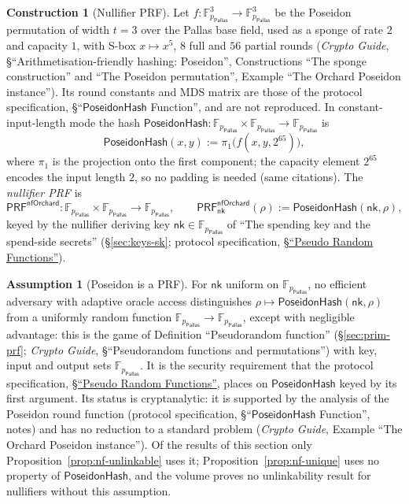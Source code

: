 \documentclass[11pt,a4paper]{article}
\theoremstyle{definition}
\newtheorem{construction}[theorem]{Construction}
\newtheorem{assumption}[theorem]{Assumption}
\newcommand{\F}{\mathbb{F}}
\newcommand{\Pallas}{\ensuremath{\mathsf{Pallas}}}
\newcommand{\nksym}{\ensuremath{\mathsf{nk}}}
\begin{document}
\begin{construction}[Nullifier PRF]
Let $f \colon \F_{p_{\Pallas}}^{3} \to \F_{p_{\Pallas}}^{3}$ be the Poseidon
permutation of width $t = 3$ over the Pallas base field, used as a sponge of
rate $2$ and capacity $1$, with S-box $x \mapsto x^{5}$, $8$ full and $56$
partial rounds (\emph{Crypto Guide}, \S``Arithmetisation-friendly hashing:
Poseidon'', Constructions ``The sponge construction'' and ``The Poseidon
permutation'', Example ``The Orchard Poseidon instance''). Its round
constants and MDS matrix are those of the protocol specification,
\S``$\mathsf{PoseidonHash}$ Function'', and are not reproduced. In
constant-input-length mode the hash
$\mathsf{PoseidonHash} \colon \F_{p_{\Pallas}} \times \F_{p_{\Pallas}} \to
\F_{p_{\Pallas}}$ is
\[
  \mathsf{PoseidonHash}(x, y) := \pi_1\bigl(f(x, y, 2^{65})\bigr),
\]
where $\pi_1$ is the projection onto the first component; the capacity
element $2^{65}$ encodes the input length $2$, so no padding is needed (same
citations). The \emph{nullifier PRF} is
\[
  \mathsf{PRF}^{\mathsf{nfOrchard}} \colon \F_{p_{\Pallas}} \times
    \F_{p_{\Pallas}} \to \F_{p_{\Pallas}}, \qquad
  \mathsf{PRF}^{\mathsf{nfOrchard}}_{\nksym}(\rho) :=
    \mathsf{PoseidonHash}(\nksym, \rho),
\]
keyed by the nullifier deriving key $\nksym \in \F_{p_{\Pallas}}$ of ``The
spending key and the spend-side secrets'' (\S\ref{sec:keys-sk}; protocol
specification,
\href{https://zips.z.cash/protocol/protocol.pdf#concreteprfs}%
{\S``Pseudo Random Functions''}).
\end{construction}

\begin{assumption}[Poseidon is a PRF]\label{ass:poseidon-prf}
For $\nksym$ uniform on $\F_{p_{\Pallas}}$, no efficient adversary with
adaptive oracle access distinguishes
$\rho \mapsto \mathsf{PoseidonHash}(\nksym, \rho)$ from a uniformly random
function $\F_{p_{\Pallas}} \to \F_{p_{\Pallas}}$, except with negligible
advantage: this is the game of Definition ``Pseudorandom function''
(\S\ref{sec:prim-prf}; \emph{Crypto Guide}, \S``Pseudorandom functions and
permutations'') with key, input and output sets $\F_{p_{\Pallas}}$. It is the
security requirement that the protocol specification,
\href{https://zips.z.cash/protocol/protocol.pdf#concreteprfs}%
{\S``Pseudo Random Functions''}, places on $\mathsf{PoseidonHash}$ keyed by
its first argument.
Its status is cryptanalytic: it is supported by the analysis of the Poseidon
round function (protocol specification, \S``$\mathsf{PoseidonHash}$
Function'', notes) and has no reduction to a standard problem
(\emph{Crypto Guide}, Example ``The Orchard Poseidon instance''). Of the
results of this section only Proposition~\ref{prop:nf-unlinkable} uses it;
Proposition~\ref{prop:nf-unique} uses no property of $\mathsf{PoseidonHash}$,
and the volume proves no unlinkability result for nullifiers without this
assumption.
\end{assumption}
\end{document}
